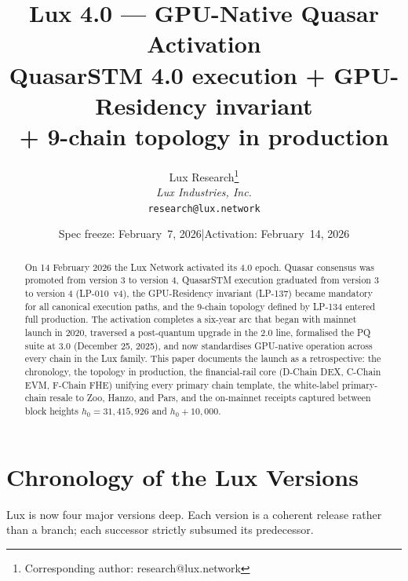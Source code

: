 \documentclass[11pt,a4paper]{article}
\title{Lux 4.0 --- GPU-Native Quasar Activation\\[4pt]
\large QuasarSTM 4.0 execution + GPU-Residency invariant\\
+ 9-chain topology in production}
\author{
Lux Research\thanks{Corresponding author: research@lux.network}\\
\textit{Lux Industries, Inc.}\\
\texttt{research@lux.network}
}
\date{Spec freeze: February~7, 2026\quad|\quad Activation: February~14, 2026}
\begin{document}
\luxcoverpage

\maketitle

\begin{abstract}
On 14 February 2026 the Lux Network activated its 4.0 epoch. Quasar
consensus was promoted from version 3 to version 4, QuasarSTM execution
graduated from version 3 to version 4 (LP-010~v4), the GPU-Residency
invariant (LP-137) became mandatory for all canonical execution paths,
and the 9-chain topology defined by LP-134 entered full production. The
activation completes a six-year arc that began with mainnet launch in
2020, traversed a post-quantum upgrade in the 2.0 line, formalised the
PQ suite at 3.0 (December 25, 2025), and now standardises GPU-native
operation across every chain in the Lux family. This paper documents
the launch as a retrospective: the chronology, the topology in
production, the financial-rail core (D-Chain DEX, C-Chain EVM, F-Chain FHE)
unifying every primary chain template, the white-label primary-chain
resale to Zoo, Hanzo, and Pars, and the on-mainnet receipts
captured between block heights $h_0 = 31{,}415{,}926$ and
$h_0 + 10{,}000$.
\end{abstract}

\tableofcontents
\newpage

\section{Chronology of the Lux Versions}
\label{sec:chronology}

Lux is now four major versions deep. Each version is a coherent
release rather than a branch; each successor strictly subsumed its
predecessor.
\end{document}

